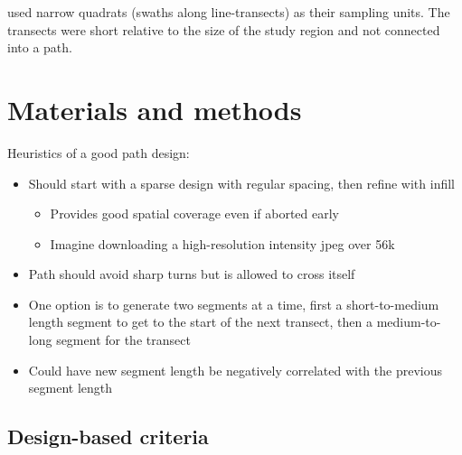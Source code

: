 \documentclass[review]{elsarticle}
\begin{document}
\citet{liuvanhatalo} used narrow quadrats (swaths along line-transects) as
their sampling units. The transects were short relative to the size of the
study region and not connected into a path.







\section{Materials and methods}

Heuristics of a good path design:
\begin{itemize}
\item Should start with a sparse design with regular spacing, then refine with
infill
\begin{itemize}
\item Provides good spatial coverage even if aborted early
\item Imagine downloading a high-resolution intensity jpeg over 56k
\end{itemize}
\item Path should avoid sharp turns but is allowed to cross itself
\item One option is to generate two segments at a time, first a short-to-medium
length segment to get to the start of the next transect, then a  medium-to-long
segment for the transect
\item Could have new segment length be negatively correlated with the previous
segment length
\end{itemize}


\subsection{Design-based criteria}
\end{document}
